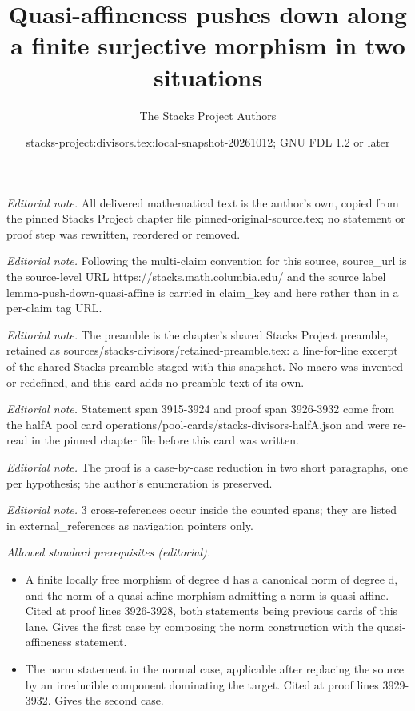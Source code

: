 \documentclass[10pt,a4paper]{amsart}
\title{Quasi-affineness pushes down along a finite surjective morphism in two situations}
\author{The Stacks Project Authors}
\date{stacks-project:divisors.tex:local-snapshot-20261012; GNU FDL 1.2 or later}
\theoremstyle{plain}
\theoremstyle{definition}
\theoremstyle{remark}
\numberwithin{equation}{subsection}
\begin{document}
\maketitle
\noindent\textit{Editorial note.} All delivered mathematical text is the author's own, copied from the pinned Stacks Project chapter file pinned-original-source.tex; no statement or proof step was rewritten, reordered or removed.\par\medskip
\noindent\textit{Editorial note.} Following the multi-claim convention for this source, source\_url is the source-level URL https://stacks.math.columbia.edu/ and the source label lemma-push-down-quasi-affine is carried in claim\_key and here rather than in a per-claim tag URL.\par\medskip
\noindent\textit{Editorial note.} The preamble is the chapter's shared Stacks Project preamble, retained as sources/stacks-divisors/retained-preamble.tex: a line-for-line excerpt of the shared Stacks preamble staged with this snapshot. No macro was invented or redefined, and this card adds no preamble text of its own.\par\medskip
\noindent\textit{Editorial note.} Statement span 3915-3924 and proof span 3926-3932 come from the halfA pool card operations/pool-cards/stacks-divisors-halfA.json and were re-read in the pinned chapter file before this card was written.\par\medskip
\noindent\textit{Editorial note.} The proof is a case-by-case reduction in two short paragraphs, one per hypothesis; the author's enumeration is preserved.\par\medskip
\noindent\textit{Editorial note.} 3 cross-references occur inside the counted spans; they are listed in external\_references as navigation pointers only.\par\medskip
\noindent\textit{Allowed standard prerequisites (editorial).}\begin{itemize}
\item A finite locally free morphism of degree d has a canonical norm of degree d, and the norm of a quasi-affine morphism admitting a norm is quasi-affine. Cited at proof lines 3926-3928, both statements being previous cards of this lane. Gives the first case by composing the norm construction with the quasi-affineness statement.
\item The norm statement in the normal case, applicable after replacing the source by an irreducible component dominating the target. Cited at proof lines 3929-3932. Gives the second case.
\end{itemize}\medskip
\end{document}
